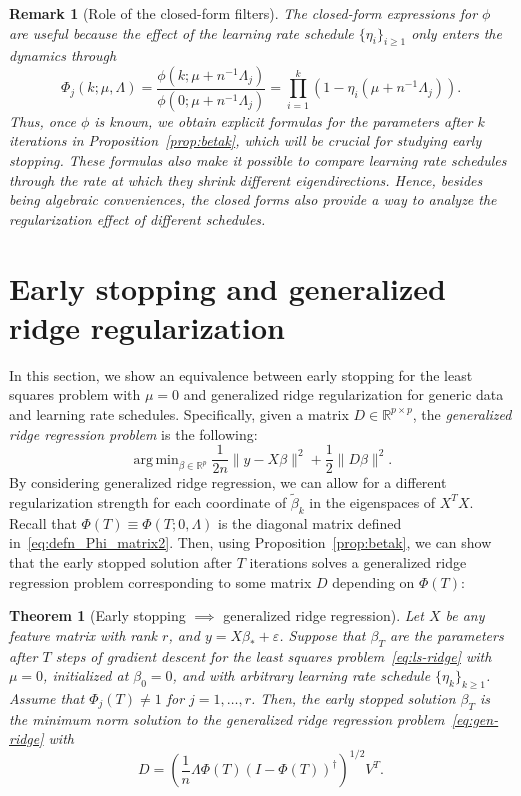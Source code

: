 \documentclass[11pt]{article}
\newtheorem{theorem}{Theorem}
\newtheorem{remark}{Remark}
\DeclareMathOperator*{\argmin}{arg\,min}
\begin{document}
\begin{remark}[Role of the closed-form filters]
The closed-form expressions for $\phi$ are useful because the effect of the learning rate schedule $\{ \eta_i \}_{i \geq 1}$ only enters the dynamics through
\[
    \Phi_j(k;\mu,\Lambda)
    = \frac{\phi(k;\mu+n^{-1}\Lambda_j)}
    {\phi(0;\mu+n^{-1}\Lambda_j)}
    = \prod_{i=1}^k
    \left(1-\eta_i(\mu+n^{-1}\Lambda_j)\right).
\]
Thus, once $\phi$ is known, we obtain explicit formulas for the parameters after $k$ iterations in Proposition~\ref{prop:betak}, which will be crucial for studying early stopping.
These formulas also make it possible to compare learning rate schedules through the rate at which they shrink different eigendirections. Hence, besides being algebraic conveniences, the closed forms also provide a way to analyze the regularization effect of different schedules.
\end{remark}


\section{Early stopping and generalized ridge regularization}

In this section, we show an equivalence between early stopping for the least squares problem with $\mu = 0$ and generalized ridge regularization for generic data and learning rate schedules.
Specifically, given a matrix $D \in \mathbb{R}^{p \times p}$, the \emph{generalized ridge regression problem} is the following:
\begin{equation} \label{eq:gen-ridge}
    \argmin_{\beta \in \mathbb{R}^p} \frac{1}{2n}\|y - X \beta\|^2 + \frac{1}{2}\| D \beta \|^2.
\end{equation}
By considering generalized ridge regression, we can allow for a different regularization strength for each coordinate of $\tilde{\beta}_k$ in the eigenspaces of $X^T X$.
Recall that $\Phi(T) \equiv \Phi(T; 0, \Lambda)$ is the diagonal matrix defined in~\eqref{eq:defn_Phi_matrix2}.
Then, using Proposition~\ref{prop:betak}, we can show that the early stopped solution after $T$ iterations solves a generalized ridge regression problem corresponding to some matrix $D$ depending on $\Phi(T)$:

\begin{theorem}[Early stopping $\implies$ generalized ridge regression] \label{thm:equivalence1}
Let $X$ be any feature matrix with rank $r$, and $y = X \beta_* + \varepsilon$. Suppose that $\beta_T$ are the parameters after $T$ steps of gradient descent for the least squares problem~\eqref{eq:ls-ridge} with $\mu = 0$, initialized at $\beta_0 = 0$, and with arbitrary learning rate schedule $\{ \eta_k\}_{k \geq 1}$. Assume that $\Phi_j(T) \ne 1$ for $j = 1, \ldots, r$. Then, the early stopped solution $\beta_T$ is the minimum norm solution to the generalized ridge regression problem~\eqref{eq:gen-ridge} with
\[
    D = \left(\frac{1}{n}\Lambda \Phi(T)(I-\Phi(T))^{\dagger}\right)^{1/2}V^T.
\]
\end{theorem}
\end{document}
